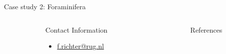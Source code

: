 \documentclass[final]{beamer}
\newlength{\sepmargin}
\newlength{\sepwid}
\newlength{\onecolwid}
\begin{document}
\begin{frame}[t]
\begin{columns}[t]
\begin{column}{0.28\paperwidth}
\begin{block}{{\small Case study 2: Foraminifera}}
   \end{block}
         

      \end{column}      
      
      \end{columns} 
       
      \begin{columns}[t] %
      
      \begin{column}{\sepmargin} \end{column}
        \begin{column}{\onecolwid} %
                \vspace*{-0.9cm}
				\begin{alertblock}{\large Contact Information}
                \vspace*{-0.5cm}
					\begin{footnotesize}
					\begin{itemize}
						\item \href{mailto:f.richter@rug.nl}{f.richter@rug.nl}
					\end{itemize}
					\end{footnotesize}	
					
				\end{alertblock}
		    \end{column} %
			\begin{column}{\sepwid}\end{column} %
			\begin{column}{\onecolwid} %
              \begin{block}{\large References}
			  \vspace*{-0.5cm}
              	\nocite{*} %
					{\footnotesize
						}
				\end{block} 
			\end{column} %
            

\end{columns}
\end{frame}
\end{document}
